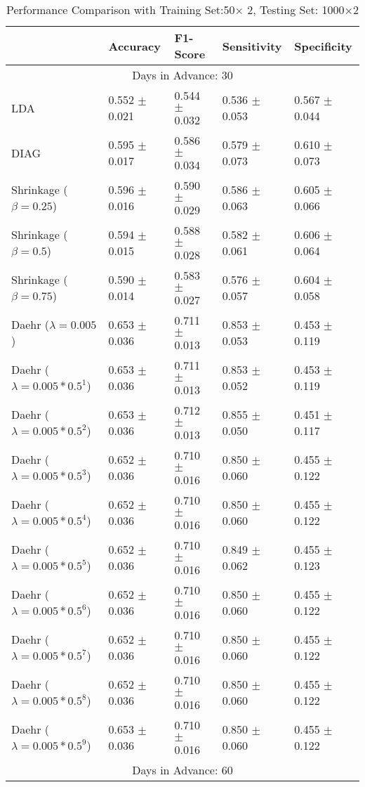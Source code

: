 \begin{table}
\caption{Performance Comparison with Training Set:50$\times$ 2, Testing Set: 1000$\times$2}
\footnotesize
\centering
\begin{tabular}{*{5}{l}}
\toprule
 & Accuracy & F1-Score & Sensitivity & Specificity\\
\hline\multicolumn{5}{c}{  Days in Advance: 30}\\\hline
LDA&0.552 $\pm$ 0.021&0.544 $\pm$ 0.032&0.536 $\pm$ 0.053&0.567 $\pm$ 0.044\\
DIAG&0.595 $\pm$ 0.017&0.586 $\pm$ 0.034&0.579 $\pm$ 0.073&0.610 $\pm$ 0.073\\
Shrinkage ($\beta=0.25$)&0.596 $\pm$ 0.016&0.590 $\pm$ 0.029&0.586 $\pm$ 0.063&0.605 $\pm$ 0.066\\
Shrinkage ($\beta=0.5$)&0.594 $\pm$ 0.015&0.588 $\pm$ 0.028&0.582 $\pm$ 0.061&0.606 $\pm$ 0.064\\
Shrinkage ($\beta=0.75$)&0.590 $\pm$ 0.014&0.583 $\pm$ 0.027&0.576 $\pm$ 0.057&0.604 $\pm$ 0.058\\
Daehr ($\lambda=0.005$)&0.653 $\pm$ 0.036&0.711 $\pm$ 0.013&0.853 $\pm$ 0.053&0.453 $\pm$ 0.119\\
Daehr ($\lambda=0.005*0.5^1$)&0.653 $\pm$ 0.036&0.711 $\pm$ 0.013&0.853 $\pm$ 0.052&0.453 $\pm$ 0.119\\
Daehr ($\lambda=0.005*0.5^2$)&0.653 $\pm$ 0.036&0.712 $\pm$ 0.013&0.855 $\pm$ 0.050&0.451 $\pm$ 0.117\\
Daehr ($\lambda=0.005*0.5^3$)&0.652 $\pm$ 0.036&0.710 $\pm$ 0.016&0.850 $\pm$ 0.060&0.455 $\pm$ 0.122\\
Daehr ($\lambda=0.005*0.5^4$)&0.652 $\pm$ 0.036&0.710 $\pm$ 0.016&0.850 $\pm$ 0.060&0.455 $\pm$ 0.122\\
Daehr ($\lambda=0.005*0.5^5$)&0.652 $\pm$ 0.036&0.710 $\pm$ 0.016&0.849 $\pm$ 0.062&0.455 $\pm$ 0.123\\
Daehr ($\lambda=0.005*0.5^6$)&0.652 $\pm$ 0.036&0.710 $\pm$ 0.016&0.850 $\pm$ 0.060&0.455 $\pm$ 0.122\\
Daehr ($\lambda=0.005*0.5^7$)&0.652 $\pm$ 0.036&0.710 $\pm$ 0.016&0.850 $\pm$ 0.060&0.455 $\pm$ 0.122\\
Daehr ($\lambda=0.005*0.5^8$)&0.652 $\pm$ 0.036&0.710 $\pm$ 0.016&0.850 $\pm$ 0.060&0.455 $\pm$ 0.122\\
Daehr ($\lambda=0.005*0.5^9$)&0.653 $\pm$ 0.036&0.710 $\pm$ 0.016&0.850 $\pm$ 0.060&0.455 $\pm$ 0.122\\
\hline\multicolumn{5}{c}{  Days in Advance: 60}\\\hline

\end{tabular}
\end{table}
